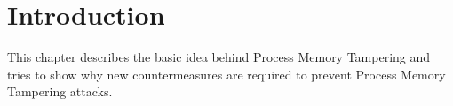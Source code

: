 \section{Introduction}
\label{sec:introduction}
This chapter describes the basic idea behind Process Memory Tampering and tries to show why new countermeasures are required to prevent Process Memory Tampering attacks.






